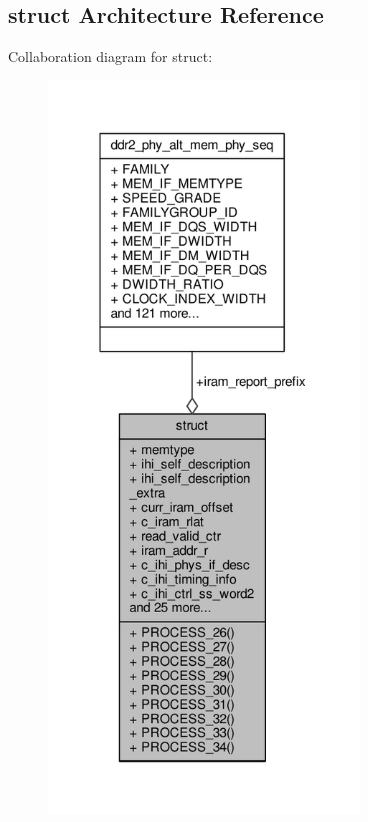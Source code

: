 \subsection{struct Architecture Reference}
\label{classddr2__phy__alt__mem__phy__iram_1_1struct}


Collaboration diagram for struct\+:\nopagebreak
\begin{figure}[H]
\begin{center}
\leavevmode
\includegraphics[height=550pt]{d1/deb/classddr2__phy__alt__mem__phy__iram_1_1struct__coll__graph}
\end{center}
\end{figure}
